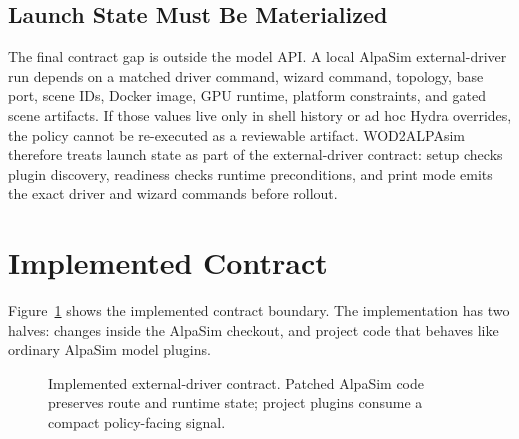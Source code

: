 \documentclass{article}
\begin{document}
\subsection{Launch State Must Be Materialized}

The final contract gap is outside the model API. A local AlpaSim external-driver run
depends on a matched driver command, wizard command, topology, base port, scene IDs,
Docker image, GPU runtime, platform constraints, and gated scene artifacts. If those
values live only in shell history or ad hoc Hydra overrides, the policy cannot be
re-executed as a reviewable artifact. WOD2ALPAsim therefore treats launch state as part
of the external-driver contract: setup checks plugin discovery, readiness checks runtime
preconditions, and print mode emits the exact driver and wizard commands before rollout.

\section{Implemented Contract}

Figure~\ref{fig:architecture} shows the implemented contract boundary. The implementation
has two halves: changes inside the AlpaSim checkout, and project code that behaves like
ordinary AlpaSim model plugins.

\begin{figure}[t]
\centering
{}
\caption{Implemented external-driver contract. Patched AlpaSim code preserves route and
runtime state; project plugins consume a compact policy-facing signal.}
\label{fig:architecture}
\end{figure}
\end{document}
